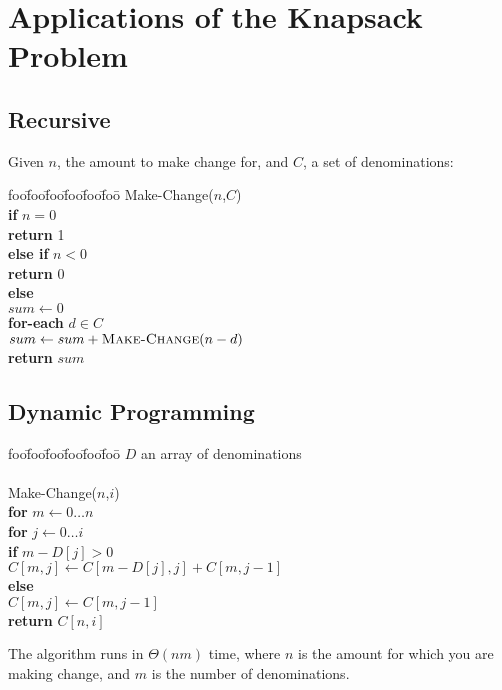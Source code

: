 \documentclass[12pt]{article}
\newenvironment{alg}{
\begin{tabbing}
foo\=foo\=foo\=foo\=foo\=foo\= \kill}
{\end{tabbing}}
\begin{document}
\section{Applications of the Knapsack Problem}
\subsection{Recursive}

Given $n$, the amount to make change for, and $C$, a set of denominations:

\begin{alg}
{\sc Make-Change}($n$,$C$) \\
\> {\bf if} $n = 0$ \\
\> \> {\bf return} 1 \\
\> {\bf else if} $n < 0$ \\
\> \> {\bf return} 0 \\
\> {\bf else} \\
\> \> $sum \leftarrow 0$ \\
\> \> {\bf for-each} $d \in C$ \\
\> \> \> $sum \leftarrow sum + \mbox{\sc Make-Change}(n-d)$ \\
\> \> {\bf return} $sum$ 
\end{alg}

\subsection{Dynamic Programming}

\begin{alg}
$D$ an array of denominations \\
\\
{\sc Make-Change}($n$,$i$) \\
\> {\bf for} $m \leftarrow 0 \dots n$ \\
\> \> {\bf for} $j \leftarrow 0 \dots i$ \\
\> \> \> {\bf if} $m - D[j] > 0$ \\
\> \> \> \> $C[m,j] \leftarrow C[m-D[j],j] + C[m,j-1]$ \\
\> \> \> {\bf else} \\
\> \> \> \> $C[m,j] \leftarrow C[m,j-1]$ \\
\> {\bf return} $C[n,i]$ 
\end{alg}

The algorithm runs in $\Theta(nm)$ time, where $n$ is the amount for which
you are making change, and $m$ is the number of denominations.
\end{document}
